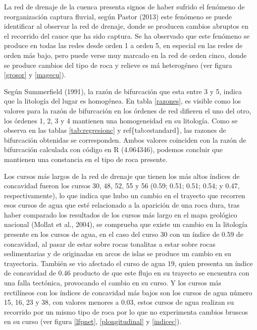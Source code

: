 \documentclass[11pt,]{article}
\begin{document}
La red de drenaje de la cuenca presenta signos de haber sufrido el
fenómeno de reorganización captura fluvial, según Pastor (2013) este
fenómeno se puede identificar al observar la red de drenaje, donde se
producen cambios abruptos en el recorrido del cauce que ha sido captura.
Se ha observado que este fenómeno se produce en todas las redes desde
orden 1 a orden 5, en especial en las redes de orden más bajo, pero
puede verse muy marcado en la red de orden cinco, donde se produce
cambios del tipo de roca y relieve es má heterogéneo (ver figura
\ref{grosor} y \ref{magecu}).

Según Summerfield (1991), la razón de bifurcación que esta entre 3 y 5,
indica que la litología del lugar es homogénea. En tabla \ref{razones},
es visible como los valores para la razón de bifurcación en los órdenes
de red difieren el uno del otro, los órdenes 1, 2, 3 y 4 mantienen una
homogeneidad en su litología. Como se observa en las tablas
\ref{tab:regresionc} y ref\{tab:estandard\}, las razones de bifurcación
obtenidas se corresponden. Ambos valores coinciden con la razón de
bifurcación calculada con código en R (4.064346), podemos concluir que
mantienen una constancia en el tipo de roca presente.

Los cursos más largos de la red de drenaje que tienen los más altos
índices de concavidad fueron los cursos 30, 48, 52, 55 y 56 (0.59; 0.51;
0.51; 0.54; y 0.47, respectivamente), lo que indica que hubo un cambio
en el trayecto que recorren esos cursos de agua que esté relacionado a
la aparición de una roca dura, tras haber comparado los resultados de
los cursos más largo en el mapa geológico nacional (Mollat et al.,
2004), se comprueba que existe un cambio en la litología presente en los
cursos de agua, en el caso del curso 30 con un índice de 0.59 de
concavidad, al pasar de estar sobre rocas tonalitas a estar sobre rocas
sedimentarias y de originadas en arcos de islas se produce un cambio en
su trayectoria. También se vio afectado el curso de agua 19, quien
presenta un índice de concavidad de 0.46 producto de que este flujo en
su trayecto se encuentra con una falla tectónica, provocando el cambio
en su curso. Y los cursos más rectilíneos con los índices de concavidad
más bajos son los cursos de agua número 15, 16, 23 y 38, con valores
menores a 0.03, estos cursos de agua realizan su recorrido por un mismo
tipo de roca por lo que no experimenta cambios bruscos en su curso (ver
figura \ref{lfpnet}, \ref{plongitudinal} y \ref{indicec}).
\end{document}
